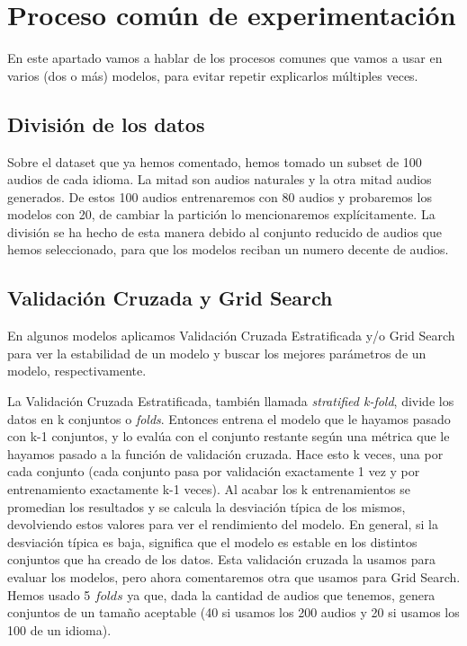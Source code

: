 \section{Proceso común de experimentación}
\label{subsec:proc_exp}

En este apartado vamos a hablar de los procesos comunes que vamos a usar en varios (dos o más) modelos, para evitar repetir explicarlos múltiples veces.

\subsection{División de los datos}

Sobre el dataset que ya hemos comentado, hemos tomado un subset de 100 audios de cada idioma. La mitad son audios naturales y la otra mitad audios generados. De estos 100 audios entrenaremos con 80 audios y probaremos los modelos con 20, de cambiar la partición lo mencionaremos explícitamente. La división se ha hecho de esta manera debido al conjunto reducido de audios que hemos seleccionado, para que los modelos reciban un numero decente de audios.

\subsection{Validación Cruzada y Grid Search}

En algunos modelos aplicamos Validación Cruzada Estratificada y/o Grid Search para ver la estabilidad de un modelo y buscar los mejores parámetros de un modelo, respectivamente.

La Validación Cruzada Estratificada, también llamada \textit{stratified k-fold}, divide los datos en k conjuntos o \textit{folds}. Entonces entrena el modelo que le hayamos pasado con k-1 conjuntos, y lo evalúa con el conjunto restante según una métrica que le hayamos pasado a la función de validación cruzada. Hace esto k veces, una por cada conjunto (cada conjunto pasa por validación exactamente 1 vez y por entrenamiento exactamente k-1 veces). Al acabar los k entrenamientos se promedian los resultados y se calcula la desviación típica de los mismos, devolviendo estos valores para ver el rendimiento del modelo. En general, si la desviación típica es baja, significa que el modelo es estable en los distintos conjuntos que ha creado de los datos. Esta validación cruzada la usamos para evaluar los modelos, pero ahora comentaremos otra que usamos para Grid Search. Hemos usado 5 $folds$ ya que, dada la cantidad de audios que tenemos, genera conjuntos de un tamaño aceptable (40 si usamos los 200 audios y 20 si usamos los 100 de un idioma).

